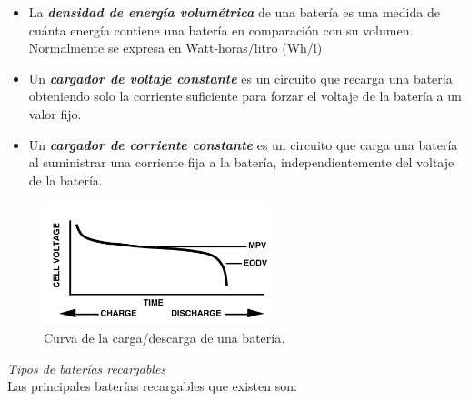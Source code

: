 \documentclass[12pt]{article}
\begin{document}
\begin{itemize}
 		\item La \textit{\textbf{densidad de energía volumétrica}} de una batería es una medida de cuánta energía contiene una batería en comparación con su volumen. Normalmente se expresa en Watt-horas/litro (Wh/l)
 		\item Un \textit{\textbf{cargador de voltaje constante}} es un circuito que recarga una batería obteniendo solo la corriente suficiente para forzar el voltaje de la batería a un valor fijo.
 		\item Un \textit{\textbf{cargador de corriente constante}} es un circuito que carga una batería al suministrar una corriente fija a la batería, independientemente del voltaje de la batería.
	\end{itemize}

	\pagebreak
	
	\begin{figure}[h]
		\begin{center}
			\includegraphics[width=0.6\textwidth]{img/chargeDischargeCurve_TxInst.png}
			\caption{Curva de la carga/descarga de una batería.}
		\end{center}
	\end{figure}


	
	\noindent \textit{Tipos de baterías recargables}\\
	
	\noindent Las principales baterías recargables que existen son: \\
	
\end{document}

